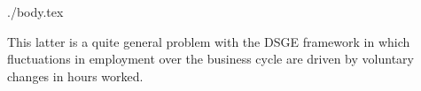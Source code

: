 \documentclass{handout}
\begin{document}
\begin{verbatimwrite}{./body.tex}
\begin{enumerate}
\begin{itemize}
\end{itemize}
\end{enumerate}

This latter is a quite general problem with the DSGE framework in which 
fluctuations in employment over the business cycle are driven by 
voluntary changes in hours worked.  

\renewcommand\refname{\noindent{\href{http://www.econ2.jhu.edu/people/ccarroll/public/lecturenotes/DSGEModels/RBC-Prescott/RBC-Prescott.bib}{\large References {\small (click to download \texttt{.bib} file)}}}}



\end{verbatimwrite}

\end{document}
